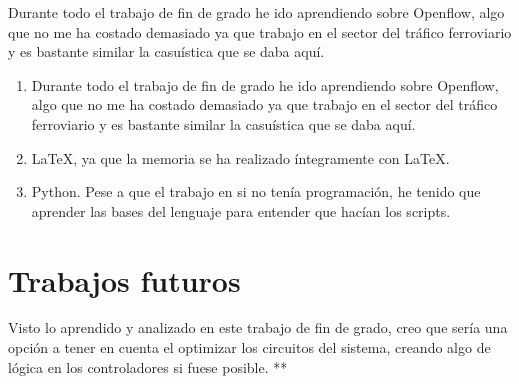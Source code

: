 \documentclass[a4paper, 12pt]{book}
\begin{document}
	Durante todo el trabajo de fin de grado he ido aprendiendo sobre Openflow, algo que no me ha costado demasiado ya que trabajo en el sector del tráfico ferroviario y es bastante similar la casuística que se daba aquí.
	
	\begin{enumerate}
		\item Durante todo el trabajo de fin de grado he ido aprendiendo sobre Openflow, algo que no me ha costado demasiado ya que trabajo en el sector del tráfico ferroviario y es bastante similar la casuística que se daba aquí.
		\item LaTeX, ya que la memoria se ha realizado íntegramente con LaTeX.
		\item Python. Pese a que el trabajo en si no tenía programación, he tenido que aprender las bases del lenguaje para entender que hacían los scripts.
	\end{enumerate}
	
	
	\section{Trabajos futuros}
	\label{sec:trabajos_futuros}
	
	Visto lo aprendido y analizado en este trabajo de fin de grado, creo que sería una opción a tener en cuenta el optimizar los circuitos del sistema, creando algo de lógica en los controladores si fuese posible. **
	
	
	
	\cleardoublepage
	
	
	\cleardoublepage
	
	
	
\end{document}
